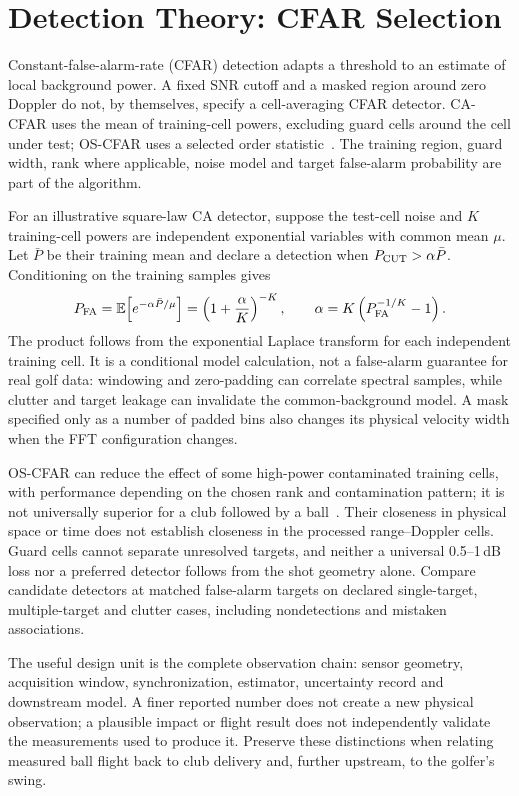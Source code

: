 \section{Detection Theory: CFAR Selection}

Constant-false-alarm-rate (CFAR) detection adapts a threshold to an estimate of local background power.
A fixed SNR cutoff and a masked region around zero Doppler do not, by themselves, specify a cell-averaging CFAR detector.
CA-CFAR uses the mean of training-cell powers, excluding guard cells around the cell under test; OS-CFAR uses a selected order statistic~\cite{cfartutorial,cfarmethods}.
The training region, guard width, rank where applicable, noise model and target false-alarm probability are part of the algorithm.

For an illustrative square-law CA detector, suppose the test-cell noise and $K$ training-cell powers are independent exponential variables with common mean $\mu$.
Let $\bar P$ be their training mean and declare a detection when $P_{\rm CUT}>\alpha\bar P$.
Conditioning on the training samples gives
\begin{equation}
\label{eq:hardwarecfar}
 P_{\rm FA}=\mathbb E\!\left[e^{-\alpha\bar P/\mu}\right]
 =\left(1+\frac{\alpha}{K}\right)^{-K},\qquad
 \alpha=K\left(P_{\rm FA}^{-1/K}-1\right).
\end{equation}
The product follows from the exponential Laplace transform for each independent training cell.
It is a conditional model calculation, not a false-alarm guarantee for real golf data: windowing and zero-padding can correlate spectral samples, while clutter and target leakage can invalidate the common-background model.
A mask specified only as a number of padded bins also changes its physical velocity width when the FFT configuration changes.

OS-CFAR can reduce the effect of some high-power contaminated training cells, with performance depending on the chosen rank and contamination pattern; it is not universally superior for a club followed by a ball~\cite{cfarmethods}.
Their closeness in physical space or time does not establish closeness in the processed range--Doppler cells.
Guard cells cannot separate unresolved targets, and neither a universal 0.5--1\,dB loss nor a preferred detector follows from the shot geometry alone.
Compare candidate detectors at matched false-alarm targets on declared single-target, multiple-target and clutter cases, including nondetections and mistaken associations.

\begin{implication}
The useful design unit is the complete observation chain: sensor geometry, acquisition window, synchronization, estimator, uncertainty record and downstream model.
A finer reported number does not create a new physical observation; a plausible impact or flight result does not independently validate the measurements used to produce it.
Preserve these distinctions when relating measured ball flight back to club delivery and, further upstream, to the golfer's swing.
\end{implication}
